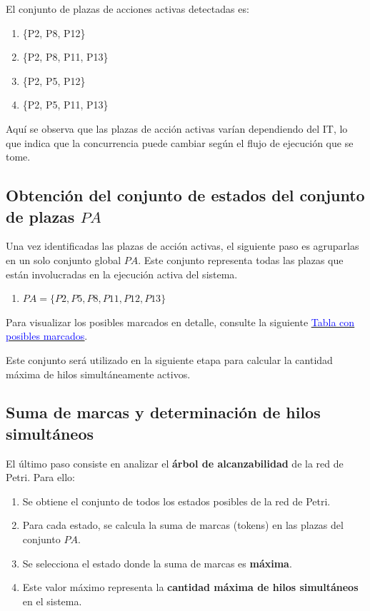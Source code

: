\documentclass[12pt]{article}
\begin{document}
El conjunto de plazas de acciones activas detectadas es:

\begin{enumerate}
    \item \{P2, P8, P12\}
    \item \{P2, P8, P11, P13\}
    \item \{P2, P5, P12\}
    \item \{P2, P5, P11, P13\}
\end{enumerate}

Aquí se observa que las plazas de acción activas varían dependiendo del IT, lo que indica que la concurrencia puede cambiar según el flujo de ejecución que se tome.

\subsection{Obtención del conjunto de estados del conjunto de plazas \( PA \)}

Una vez identificadas las plazas de acción activas, el siguiente paso es agruparlas en un solo conjunto global \( PA \). Este conjunto representa todas las plazas que están involucradas en la ejecución activa del sistema.

\begin{enumerate}
    \item \( PA = \{P2, P5, P8, P11, P12, P13\} \)
\end{enumerate}

Para visualizar los posibles marcados en detalle, consulte la siguiente 
\underline{\href{https://docs.google.com/spreadsheets/d/13lKcZztay1l-gB23JhTxPS3u15EKYW5BMGamDRmy2Xo/edit}{\textcolor{blue}{Tabla con posibles marcados}}}.

Este conjunto será utilizado en la siguiente etapa para calcular la cantidad máxima de hilos simultáneamente activos.

\subsection{Suma de marcas y determinación de hilos simultáneos}

El último paso consiste en analizar el \textbf{árbol de alcanzabilidad} de la red de Petri. Para ello:
\begin{enumerate}
    \item Se obtiene el conjunto de todos los estados posibles de la red de Petri.
    \item Para cada estado, se calcula la suma de marcas (tokens) en las plazas del conjunto \( PA \).
    \item Se selecciona el estado donde la suma de marcas es \textbf{máxima}.
    \item Este valor máximo representa la \textbf{cantidad máxima de hilos simultáneos} en el sistema.
\end{enumerate}
\end{document}
